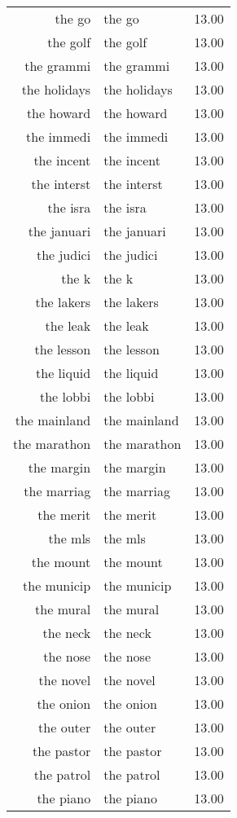 \begin{table}[ht]
\begin{tabular}{rlr}
  the go & the go & 13.00 \\ 
  the golf & the golf & 13.00 \\ 
  the grammi & the grammi & 13.00 \\ 
  the holidays & the holidays & 13.00 \\ 
  the howard & the howard & 13.00 \\ 
  the immedi & the immedi & 13.00 \\ 
  the incent & the incent & 13.00 \\ 
  the interst & the interst & 13.00 \\ 
  the isra & the isra & 13.00 \\ 
  the januari & the januari & 13.00 \\ 
  the judici & the judici & 13.00 \\ 
  the k & the k & 13.00 \\ 
  the lakers & the lakers & 13.00 \\ 
  the leak & the leak & 13.00 \\ 
  the lesson & the lesson & 13.00 \\ 
  the liquid & the liquid & 13.00 \\ 
  the lobbi & the lobbi & 13.00 \\ 
  the mainland & the mainland & 13.00 \\ 
  the marathon & the marathon & 13.00 \\ 
  the margin & the margin & 13.00 \\ 
  the marriag & the marriag & 13.00 \\ 
  the merit & the merit & 13.00 \\ 
  the mls & the mls & 13.00 \\ 
  the mount & the mount & 13.00 \\ 
  the municip & the municip & 13.00 \\ 
  the mural & the mural & 13.00 \\ 
  the neck & the neck & 13.00 \\ 
  the nose & the nose & 13.00 \\ 
  the novel & the novel & 13.00 \\ 
  the onion & the onion & 13.00 \\ 
  the outer & the outer & 13.00 \\ 
  the pastor & the pastor & 13.00 \\ 
  the patrol & the patrol & 13.00 \\ 
  the piano & the piano & 13.00 \\ 

\end{tabular}
\end{table}
